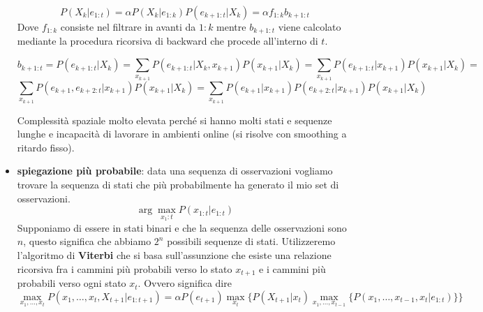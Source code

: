 \begin{itemize}
    $$P(X_k | e_{1:t}) =\alpha P(X_{k}|e_{1:k}) P (e_{k+1:t}|X_k) =\alpha f_{1:k}b_{k+1:t} $$
    Dove $f_{1:k}$ consiste nel filtrare in avanti da $1:k$ mentre $b_{k+1:t}$ viene 
    calcolato mediante la procedura ricorsiva di backward che procede all'interno di $t$.

    $$b_{k+1:t} = P(e_{k+1:t}|X_k)=\sum_{x_{k+1}} P (e_{k+1:t}|X_k,x_{k+1}) P (x_{k+1}|X_k)=\sum_{x_{k+1}} P (e_{k+1:t}|x_{k+1}) P (x_{k+1}|X_k)=$$
    $$\sum_{x_{k+1}} P (e_{k+1},e_{k+2:t}|x_{k+1}) P (x_{k+1}|X_k) =\sum_{x_{k+1}} P (e_{k+1}|x_{k+1}) P(e_{k+2:t} | x_{k+1}) P (x_{k+1}|X_k)$$
    
    Complessità spaziale molto elevata perché si hanno molti stati e sequenze lunghe e 
    incapacità di lavorare in ambienti online (si risolve con smoothing a ritardo fisso).
    \item \textbf{spiegazione più probabile}: data una sequenza di osservazioni
    vogliamo trovare la sequenza di stati che più probabilmente ha generato il mio
    set di osservazioni.
    $$\arg\max_{x_1:t} P(x_{1:t}|e_{1:t})$$
    Supponiamo di essere in stati binari e che la sequenza delle osservazioni sono $n$,
    questo significa che abbiamo $2^n$ possibili sequenze di stati. Utilizzeremo 
    l'algoritmo di \textbf{Viterbi} che si basa sull'assunzione che esiste una 
    relazione ricorsiva fra i cammini più probabili verso lo stato $x_{t+1}$ e i 
    cammini più probabili verso ogni stato $x_t$. Ovvero significa dire
    $$\max _{x_1,\dots, x_t} P(x_1,\dots,x_t,X_{t+1}|e_{1:t+1})= \alpha P(e_{t+1})\max_{x_t} \{P(X_{t+1}|x_t)\max_{x_1,\dots,x_{t-1}} \{P(x_1,\dots,x_{t-1},x_t|e_{1:t})\}\}$$
\end{itemize}
